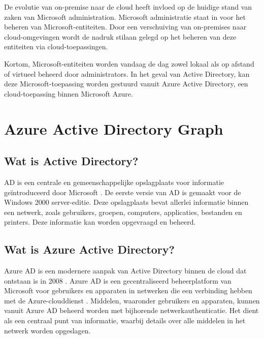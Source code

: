 De evolutie van on-premise naar de cloud heeft invloed op de huidige stand van zaken van Microsoft administration. Microsoft administratie staat in voor het beheren van Microsoft-entiteiten. Door een verschuiving van on-premises naar cloud-omgevingen wordt de nadruk stilaan gelegd op het beheren van deze entiteiten via cloud-toepassingen. %

Kortom, Microsoft-entiteiten worden vandaag de dag zowel lokaal als op afstand of virtueel beheerd door administrators. In het geval van Active Directory, kan deze Microsoft-toepassing worden gestuurd vanuit Azure Active Directory, een cloud-toepassing binnen Microsoft Azure. %



\section{Azure Active Directory Graph}

\subsection{Wat is Active Directory?}

\ac{AD} is een centrale en gemeenschappelijke opslagplaats voor informatie geïntroduceerd door Microsoft \autocite{Allen2003}. De eerste versie van \ac{AD} is gemaakt voor de Windows 2000 server-editie. Deze opslagplaats bevat allerlei informatie binnen een netwerk, zoals gebruikers, groepen, computers, applicaties, bestanden en printers. Deze informatie kan worden opgevraagd en beheerd.

\subsection{Wat is Azure Active Directory?}

Azure \ac{AD} is een modernere aanpak van Active Directory binnen de cloud dat ontstaan is in 2008 \autocite{Chappell2008}. Azure \ac{AD} is een gecentraliseerd beheerplatform van Microsoft voor gebruikers en apparaten in netwerken die een verbinding hebben met de Azure-clouddienst \autocite{Mayank2019}. Middelen, waaronder gebruikers en apparaten, kunnen vanuit Azure \ac{AD} beheerd worden met bijhorende netwerkauthenticatie. Het dient als een centraal punt van informatie, waarbij details over alle middelen in het netwerk worden opgeslagen.

